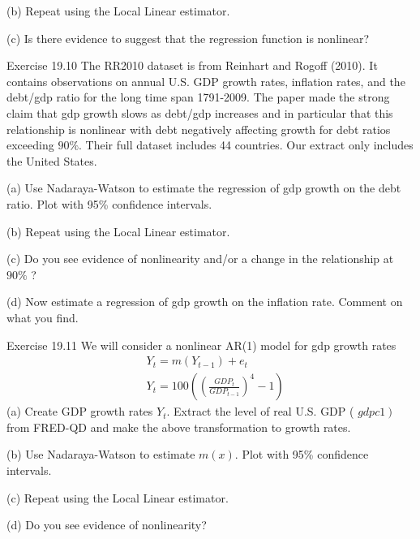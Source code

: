 \documentclass[10pt]{article}
\begin{document}
(b) Repeat using the Local Linear estimator.

(c) Is there evidence to suggest that the regression function is nonlinear?

Exercise 19.10 The RR2010 dataset is from Reinhart and Rogoff (2010). It contains observations on annual U.S. GDP growth rates, inflation rates, and the debt/gdp ratio for the long time span 1791-2009. The paper made the strong claim that gdp growth slows as debt/gdp increases and in particular that this relationship is nonlinear with debt negatively affecting growth for debt ratios exceeding $90 \%$. Their full dataset includes 44 countries. Our extract only includes the United States.

(a) Use Nadaraya-Watson to estimate the regression of gdp growth on the debt ratio. Plot with 95\% confidence intervals.

(b) Repeat using the Local Linear estimator.

(c) Do you see evidence of nonlinearity and/or a change in the relationship at $90 \%$ ?

(d) Now estimate a regression of gdp growth on the inflation rate. Comment on what you find.

Exercise 19.11 We will consider a nonlinear AR(1) model for gdp growth rates
$$
\begin{aligned}
&Y_{t}=m\left(Y_{t-1}\right)+e_{t} \\
&Y_{t}=100\left(\left(\frac{G D P_{t}}{G D P_{t-1}}\right)^{4}-1\right)
\end{aligned}
$$
(a) Create GDP growth rates $Y_{t}$. Extract the level of real U.S. GDP ( $\left.g d p c 1\right)$ from FRED-QD and make the above transformation to growth rates.

(b) Use Nadaraya-Watson to estimate $m(x)$. Plot with 95\% confidence intervals.

(c) Repeat using the Local Linear estimator.

(d) Do you see evidence of nonlinearity?
\end{document}
